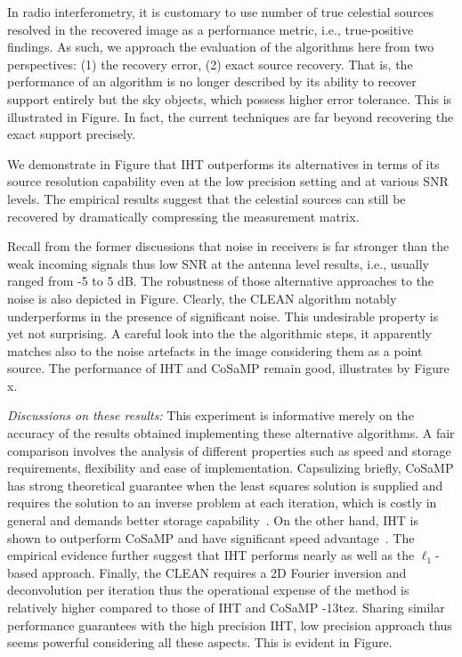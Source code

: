 \documentclass{article}
\begin{document}
In radio interferometry, it is customary to use number of true celestial sources resolved in the recovered image as a performance metric, i.e., true-positive findings. As such, we approach the evaluation of the algorithms here from two perspectives: (1) the recovery error, (2) exact source recovery. That is, the performance of an algorithm is no longer described by its ability to recover support entirely but the sky objects, which possess higher error tolerance. This is illustrated in Figure. In fact, the current techniques are far beyond recovering the exact support precisely.

We demonstrate in Figure that IHT outperforms its alternatives in terms of its source resolution capability even at the low precision setting and at various SNR levels. The empirical results suggest that the celestial sources can still be recovered by dramatically compressing the measurement matrix.

Recall from the former discussions that noise in receivers is far stronger than the weak incoming signals thus low SNR at the antenna level results, i.e., usually ranged from -5 to 5 dB. The robustness of those alternative approaches to the noise is also depicted in Figure. Clearly, the CLEAN algorithm notably underperforms in the presence of significant noise. This undesirable property is yet not surprising. A careful look into the the algorithmic steps, it apparently matches also to the noise artefacts in the image considering them as a point source. The performance of IHT and CoSaMP remain good, illustrates by Figure x.


{\it Discussions on these results:} This experiment is informative merely on the accuracy of the results obtained implementing these alternative algorithms. A fair comparison involves the analysis of different properties such as speed and storage requirements, flexibility and ease of implementation. Capsulizing briefly, CoSaMP has strong theoretical guarantee when the least squares solution is supplied and requires the solution to an inverse problem at each iteration, which is costly in general and demands better storage capability~\cite{needel2008cosamp}. On the other hand, IHT is shown to outperform CoSaMP and have significant speed advantage~\cite{blumensath2012greedy}. The empirical evidence further suggest that IHT performs nearly as well as the $\ell_1$-based approach. Finally, the CLEAN requires a 2D Fourier inversion and deconvolution per iteration thus the operational expense of the method is relatively higher compared to those of IHT and CoSaMP -13tez. Sharing similar performance guarantees with the high precision IHT, low precision approach thus seems powerful considering all these aspects. This is evident in Figure.
\end{document}
